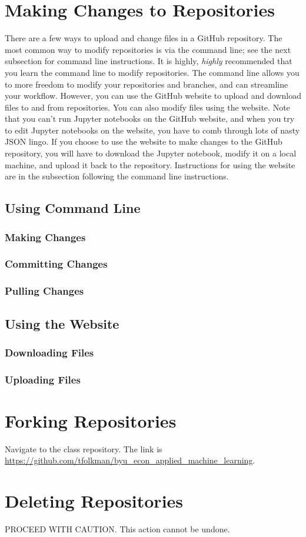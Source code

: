 \documentclass[11pt,a4paper]{article}
\begin{document}
\section*{Making Changes to Repositories}
There are a few ways to upload and change files in a GitHub repository.
The most common way to modify repositories is via the command line; see the next subsection for command line instructions.
It is highly, \textit{highly} recommended that you learn the command line to modify repositories.
The command line allows you to more freedom to modify your repositories and branches, and can streamline your workflow.
However, you can use the GitHub website to upload and download files to and from repositories.
You can also modify files using the website.
Note that you can't run Jupyter notebooks on the GitHub website, and when you try to edit Jupyter notebooks on the website, you have to comb through lots of nasty JSON lingo.
If you choose to use the website to make changes to the GitHub repository, you will have to download the Jupyter notebook, modify it on a local machine, and upload it back to the repository.
Instructions for using the website are in the subsection following the command line instructions.

\subsection*{Using Command Line}
\subsubsection*{Making Changes}

\subsubsection*{Committing Changes}

\subsubsection*{Pulling Changes}

\subsection*{Using the Website}
\subsubsection*{Downloading Files}

\subsubsection*{Uploading Files}

\section*{Forking Repositories}
Navigate to the class repository. 
The link is \url{https://github.com/tfolkman/byu_econ_applied_machine_learning}.

\section*{Deleting Repositories}
PROCEED WITH CAUTION.
This action cannot be undone.
\end{document}

